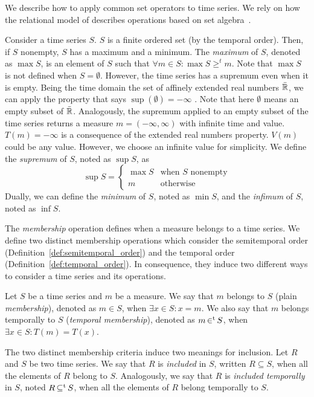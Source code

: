 We describe how to apply common set operators to time series. We rely
on how the relational model of  describes operations based
on set algebra~\cite{date:introduction}.

Consider a time series $S$. $S$ is a finite ordered set (by the
temporal order). Then, if $S$ nonempty, $S$ has a maximum and a
minimum.  The \emph{maximum} of $S$, denoted as $\max S$, is an
element of $S$ such that $\forall m \in S:\max S\geq^t m $.  Note that
$\max S$ is not defined when $S=\emptyset$. However, the time series
has a supremum even when it is empty.  Being the time domain the set
of affinely extended real numbers $\bar{\mathbb{R}}$, we can apply the property
that says $\sup(\emptyset)=-\infty$ \cite{cantrell:extendedreal}. Note
that here $\emptyset$ means an empty subset of $\bar{\mathbb{R}}$. Analogously, the
supremum applied to an empty subset of the time series returns a
measure $m=(-\infty,\infty)$ with infinite time and
value. $T(m)=-\infty$ is a consequence of the extended real numbers
property.  $V(m)$ could be any value. However, we choose an infinite
value for simplicity. We define the \emph{supremum} of $S$, noted as
$\sup S$, as
\[
\sup S =\begin{cases}
  \max S    & \text{when $S$ nonempty}\\
  m   & \text{otherwise}
\end{cases}
\]
Dually, we can define the \emph{minimum} of $S$, noted as $\min S$,
and the \emph{infimum} of $S$, noted as $\inf S$.

The \emph{membership} operation defines when a measure belongs to a
time series. We define two distinct membership operations which
consider the semitemporal order
(Definition~\ref{def:semitemporal_order}) and the temporal order
(Definition~\ref{def:temporal_order}). In consequence, they induce two
different ways to consider a time series and its operations.

Let $S$ be a time series and $m$ be a measure. We say that $m$ belongs
to $S$ (plain \emph{membership}), denoted as $m \in S$, when $\exists
x\in S: x=m$.  We also say that $m$ belongs temporally to $S$
(\emph{temporal membership}), denoted as $m \operatorname*{\in^t} S$, when $\exists
x\in S : T(m)=T(x)$.

The two distinct membership criteria induce two meanings for
inclusion. Let $R$ and $S$ be two time series.  We say that $R$ is
\emph{included} in $S$, written $R\subseteq S$, when all the elements
of $R$ belong to $S$.  Analogously, we say that $R$ is \emph{included
  temporally} in $S$, noted $R\operatorname*{\subseteq^t} S$, when all the elements of
$R$ belong temporally to $S$.

